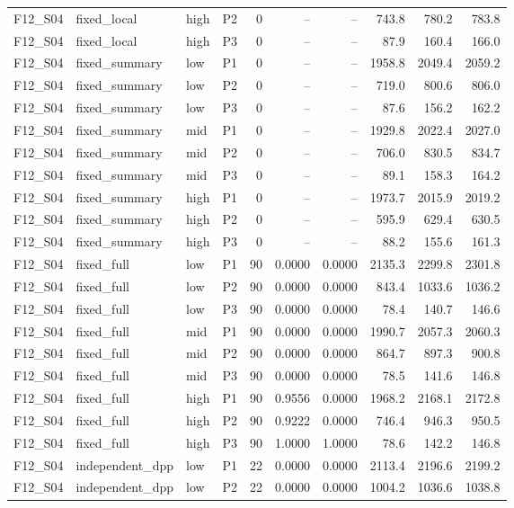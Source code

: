 \begin{longtable}{llllrrrrrr}
F12\_S04 & fixed\_local & high & P2 & 0 & -- & -- & 743.8 & 780.2 & 783.8 \\
F12\_S04 & fixed\_local & high & P3 & 0 & -- & -- & 87.9 & 160.4 & 166.0 \\
F12\_S04 & fixed\_summary & low & P1 & 0 & -- & -- & 1958.8 & 2049.4 & 2059.2 \\
F12\_S04 & fixed\_summary & low & P2 & 0 & -- & -- & 719.0 & 800.6 & 806.0 \\
F12\_S04 & fixed\_summary & low & P3 & 0 & -- & -- & 87.6 & 156.2 & 162.2 \\
F12\_S04 & fixed\_summary & mid & P1 & 0 & -- & -- & 1929.8 & 2022.4 & 2027.0 \\
F12\_S04 & fixed\_summary & mid & P2 & 0 & -- & -- & 706.0 & 830.5 & 834.7 \\
F12\_S04 & fixed\_summary & mid & P3 & 0 & -- & -- & 89.1 & 158.3 & 164.2 \\
F12\_S04 & fixed\_summary & high & P1 & 0 & -- & -- & 1973.7 & 2015.9 & 2019.2 \\
F12\_S04 & fixed\_summary & high & P2 & 0 & -- & -- & 595.9 & 629.4 & 630.5 \\
F12\_S04 & fixed\_summary & high & P3 & 0 & -- & -- & 88.2 & 155.6 & 161.3 \\
F12\_S04 & fixed\_full & low & P1 & 90 & 0.0000 & 0.0000 & 2135.3 & 2299.8 & 2301.8 \\
F12\_S04 & fixed\_full & low & P2 & 90 & 0.0000 & 0.0000 & 843.4 & 1033.6 & 1036.2 \\
F12\_S04 & fixed\_full & low & P3 & 90 & 0.0000 & 0.0000 & 78.4 & 140.7 & 146.6 \\
F12\_S04 & fixed\_full & mid & P1 & 90 & 0.0000 & 0.0000 & 1990.7 & 2057.3 & 2060.3 \\
F12\_S04 & fixed\_full & mid & P2 & 90 & 0.0000 & 0.0000 & 864.7 & 897.3 & 900.8 \\
F12\_S04 & fixed\_full & mid & P3 & 90 & 0.0000 & 0.0000 & 78.5 & 141.6 & 146.8 \\
F12\_S04 & fixed\_full & high & P1 & 90 & 0.9556 & 0.0000 & 1968.2 & 2168.1 & 2172.8 \\
F12\_S04 & fixed\_full & high & P2 & 90 & 0.9222 & 0.0000 & 746.4 & 946.3 & 950.5 \\
F12\_S04 & fixed\_full & high & P3 & 90 & 1.0000 & 1.0000 & 78.6 & 142.2 & 146.8 \\
F12\_S04 & independent\_dpp & low & P1 & 22 & 0.0000 & 0.0000 & 2113.4 & 2196.6 & 2199.2 \\
F12\_S04 & independent\_dpp & low & P2 & 22 & 0.0000 & 0.0000 & 1004.2 & 1036.6 & 1038.8 \\

\end{longtable}

